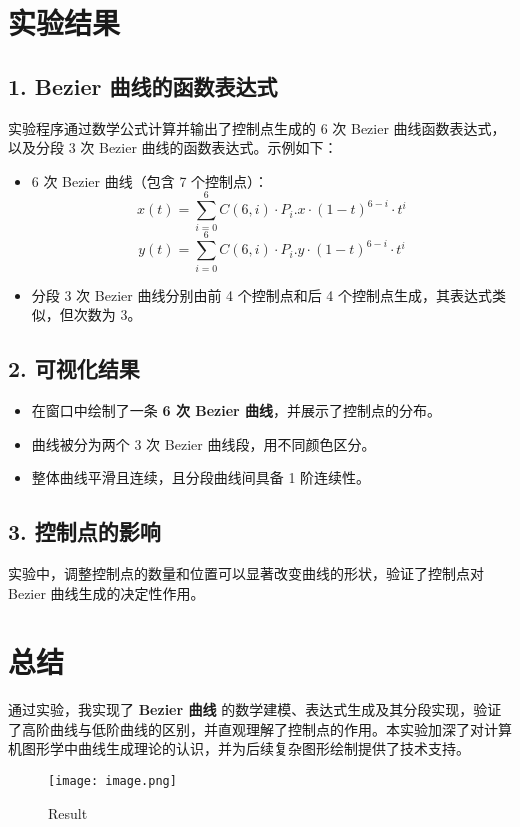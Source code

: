 \documentclass[a4paper,12pt]{article}
\begin{document}
\section{实验结果}
\subsection*{1. Bezier 曲线的函数表达式}
实验程序通过数学公式计算并输出了控制点生成的 6 次 Bezier 曲线函数表达式，以及分段 3 次 Bezier 曲线的函数表达式。示例如下：
\begin{itemize}
    \item 6 次 Bezier 曲线（包含 7 个控制点）：
    \[
    x(t) = \sum_{i=0}^6 C(6, i) \cdot P_i.x \cdot (1-t)^{6-i} \cdot t^i
    \]
    \[
    y(t) = \sum_{i=0}^6 C(6, i) \cdot P_i.y \cdot (1-t)^{6-i} \cdot t^i
    \]
    \item 分段 3 次 Bezier 曲线分别由前 4 个控制点和后 4 个控制点生成，其表达式类似，但次数为 3。
\end{itemize}

\subsection*{2. 可视化结果}
\begin{itemize}
    \item 在窗口中绘制了一条 \textbf{6 次 Bezier 曲线}，并展示了控制点的分布。
    \item 曲线被分为两个 3 次 Bezier 曲线段，用不同颜色区分。
    \item 整体曲线平滑且连续，且分段曲线间具备 1 阶连续性。
\end{itemize}

\subsection*{3. 控制点的影响}
实验中，调整控制点的数量和位置可以显著改变曲线的形状，验证了控制点对 Bezier 曲线生成的决定性作用。

\section*{总结}
通过实验，我实现了 \textbf{Bezier 曲线} 的数学建模、表达式生成及其分段实现，验证了高阶曲线与低阶曲线的区别，并直观理解了控制点的作用。本实验加深了对计算机图形学中曲线生成理论的认识，并为后续复杂图形绘制提供了技术支持。

\begin{figure}
    \centering
    \texttt{[image: image.png]}
    \caption{Result}
    \label{fig:enter-label}
\end{figure}
\end{document}
